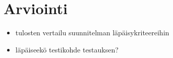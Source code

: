 \section{Arviointi}

\begin{itemize}
	\item tulosten vertailu suunnitelman läpäisykriteereihin
	\item läpäiseekö testikohde testauksen?
\end{itemize}